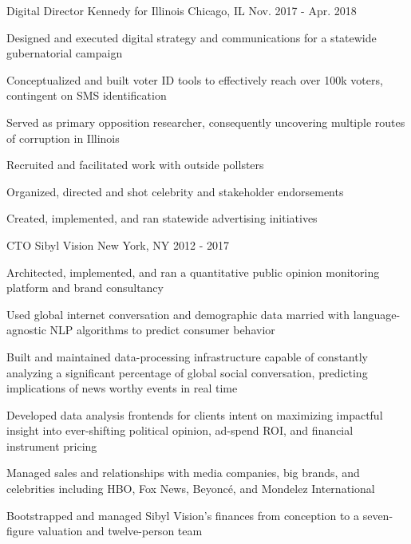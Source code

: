 

\begin{cventries}

  \cventry
    {Digital Director} %
    {Kennedy for Illinois} %
    {Chicago, IL} %
    {Nov. 2017 - Apr. 2018} %
    {
      \begin{cvitems} %
	      \item {Designed and executed digital strategy and communications for a statewide gubernatorial campaign}
          \item {Conceptualized and built voter ID tools to effectively reach over 100k voters, contingent on SMS identification}
          \item {Served as primary opposition researcher, consequently uncovering multiple routes of corruption in Illinois}
          \item {Recruited and facilitated work with outside pollsters}
          \item {Organized, directed and shot celebrity and stakeholder endorsements}
          \item {Created, implemented, and ran statewide advertising initiatives}
      \end{cvitems}
    }

  \cventry
    {CTO} %
    {Sibyl Vision} %
    {New York, NY} %
    {2012 - 2017} %
    {
      \begin{cvitems} %
      	\item {Architected, implemented, and ran a quantitative public opinion monitoring platform and brand consultancy}
        \item {Used global internet conversation and demographic data married with language-agnostic NLP algorithms to predict consumer behavior}
        \item {Built and maintained data-processing infrastructure capable of constantly analyzing a significant percentage of global social conversation, predicting implications of news worthy events in real time}
        \item {Developed data analysis frontends for clients intent on maximizing impactful insight into ever-shifting political opinion, ad-spend ROI, and financial instrument pricing}
    	\item {Managed sales and relationships with media companies, big brands, and celebrities including HBO, Fox News, Beyoncé, and Mondelez International}
        \item {Bootstrapped and managed Sibyl Vision's finances from conception to a seven-figure valuation and twelve-person team}
      \end{cvitems}
    }


\end{cventries}
